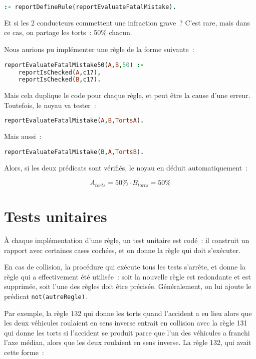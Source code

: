 \begin{lstlisting}[language=Prolog,frame=single]
:- reportDefineRule(reportEvaluateFatalMistake).
\end{lstlisting}

Et si les 2 conducteurs commettent une infraction grave~?
C'est rare, mais dans ce cas, on partage les torts~: 50\% chacun.

Nous aurions pu implémenter une règle de la forme suivante~:

\begin{lstlisting}[language=Prolog,frame=single]
reportEvaluateFatalMistake50(A,B,50) :-
    reportIsChecked(A,c17),
    reportIsChecked(B,c17).
\end{lstlisting}

Mais cela duplique le code pour chaque règle, et peut être la cause d'une erreur. Toutefois, le noyau va tester~:

\begin{lstlisting}[language=Prolog,frame=single]
reportEvaluateFatalMistake(A,B,TortsA).
\end{lstlisting}

Mais aussi~:

\begin{lstlisting}[language=Prolog,frame=single]
reportEvaluateFatalMistake(B,A,TortsB).
\end{lstlisting}

Alors, si les deux prédicats sont vérifiés, le noyau en déduit automatiquement~:

\[A_{torts} = 50\% \cdot B_{torts} = 50\%\]

\section{Tests unitaires}

À chaque implémentation d'une règle, un test unitaire est codé~: il construit un rapport avec certaines cases cochées, et on donne la règle qui doit s'exécuter.

En cas de collision, la procédure qui exécute tous les tests s'arrête, et donne la règle qui a effectivement été utilisée~: soit la nouvelle règle est redondante et est supprimée, soit l'une des règles doit être précisée. Généralement, on lui ajoute le prédicat \texttt{not(autreRegle)}.

Par exemple, la règle 132 qui donne les torts quand l'accident a eu lieu alors que les deux véhicules roulaient en sens inverse entrait en collision avec la règle 131 qui donne les torts si l'accident se produit parce que l'un des véhicules a franchi l'axe médian, alors que les deux roulaient en sens inverse.
La règle 132, qui avait cette forme~:

